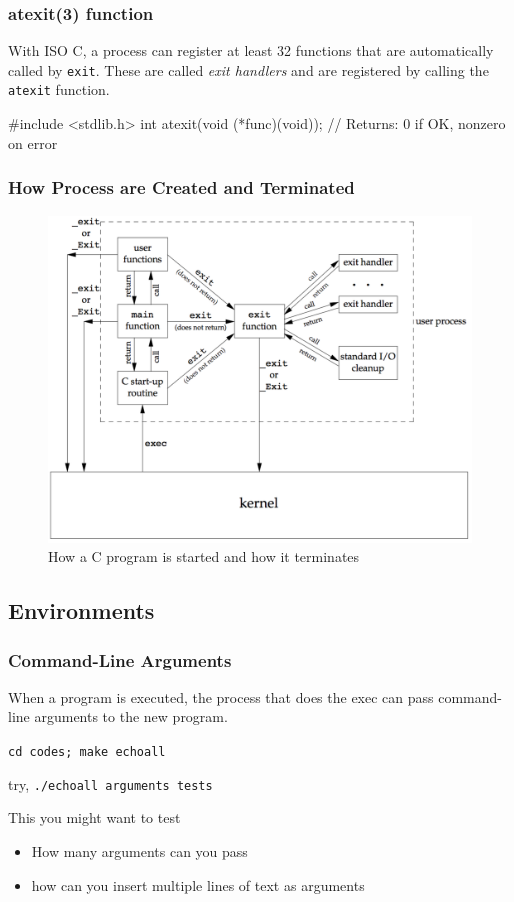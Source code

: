 \documentclass[newPxFont,sthlmFooter,nooffset]{beamer}
\begin{document}
\begin{frame}[containsverbatim,t]
  \frametitle{atexit(3) function}
With ISO C, a process can register at least 32 functions that are automatically called by
\texttt{exit}. These are called \textit{exit handlers} and are registered by calling the \texttt{atexit} function.

\begin{codedef}
#include <stdlib.h>
int atexit(void (*func)(void));
// Returns: 0 if OK, nonzero on error    
\end{codedef}


\end{frame}


\begin{frame}[t]
  \frametitle{How Process are Created and Terminated}

\begin{figure}[h]
  \centering
  \includegraphics[height=0.85\textheight]{figure/fig7-2_how_prog.png}
  \caption{How a C program is started and how it terminates}
\end{figure}
\end{frame}




\subsection{Environments}

\begin{frame}
  \frametitle{Command-Line Arguments}
When a program is executed, the process that does the exec can pass command-line arguments to the new program.

\texttt{cd codes; make echoall}

  

try,
\texttt{./echoall arguments tests}

This you might want to test
\begin{itemize}
\item How many arguments can you pass
\item how can you insert multiple lines of text as arguments
\end{itemize}
\end{frame}
\end{document}
